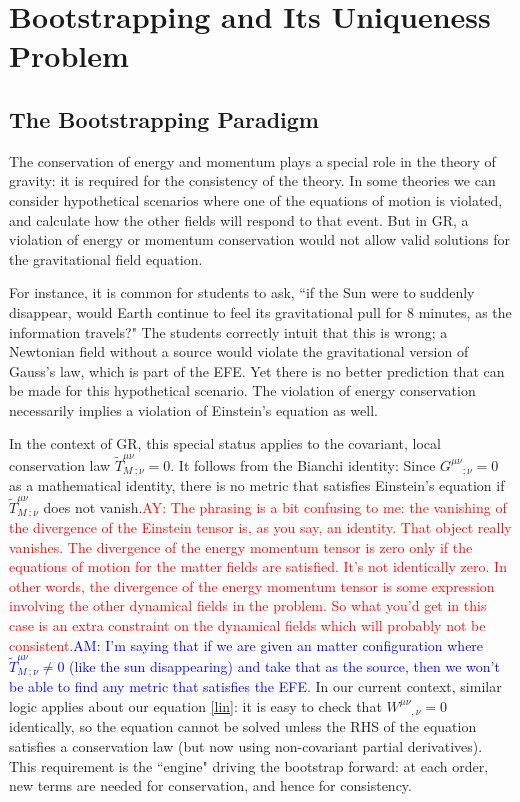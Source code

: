 \documentclass[aps,physrev,preprint,groupedaddress]{revtex4-2}
\newcommand{\AY}[1]{\textcolor{red}{AY: #1}}
\newcommand{\AM}[1]{\textcolor{blue}{AM: #1}}
\begin{document}
\section{Bootstrapping and Its Uniqueness Problem}

\subsection{The Bootstrapping Paradigm}

The conservation of energy and momentum plays a special role in the
theory of gravity: it is required for the consistency of the theory. In some
theories we can consider hypothetical scenarios where one of the
equations of motion is violated, and calculate how the other fields will
respond to that event. But in GR, a violation of energy or momentum conservation would not allow valid solutions for the gravitational field equation. 

For instance, it is common for students to ask, ``if the Sun were to suddenly disappear, would Earth continue to feel its gravitational pull for 8 minutes, as the information travels?" The students correctly intuit that this is wrong; a Newtonian field without a source would violate the gravitational version of Gauss's law, which is part of the EFE. Yet there is no better prediction that can be made for this hypothetical scenario. The
violation of energy conservation necessarily implies a violation of
Einstein's equation as well.

In the context of GR, this special status applies to the covariant, local
conservation law \(\widetilde{T}_M^{\mu\nu}{}_{;\nu} = 0\).
It follows from the Bianchi identity: Since \(G^{\mu\nu}{}_{;\nu} = 0\) as a mathematical identity, there is no metric that satisfies Einstein's equation if \(\widetilde{T}_M^{\mu\nu}{}_{;\nu}\) does not vanish.\AY{The phrasing is a bit confusing to me: the vanishing of the divergence of the Einstein tensor is, as you say, an identity. That object really vanishes. The divergence of the energy momentum tensor is zero only if the equations of motion for the matter fields are satisfied. It's not identically zero. In other words, the divergence of the energy momentum tensor is some expression involving the other dynamical fields in the problem. So what you'd get in this case is an extra constraint on the dynamical fields which will probably not be consistent.}\AM{I'm saying that if we are given an  matter configuration where \(\widetilde{T}_M^{\mu\nu}{}_{;\nu}\ne0\) (like the sun disappearing) and take that as the source, then we won't be able to find any metric that satisfies the EFE.} In our current context, similar logic applies about our equation \eqref{lin}: it is easy to check that \(W^{\mu\nu}{}_{,\nu} = 0\) identically, so the equation cannot be solved unless the RHS of the equation satisfies a conservation law (but now using non-covariant partial derivatives). This requirement is the ``engine" driving the bootstrap forward: at each order, new terms are needed for conservation, and hence for consistency.
\end{document}
